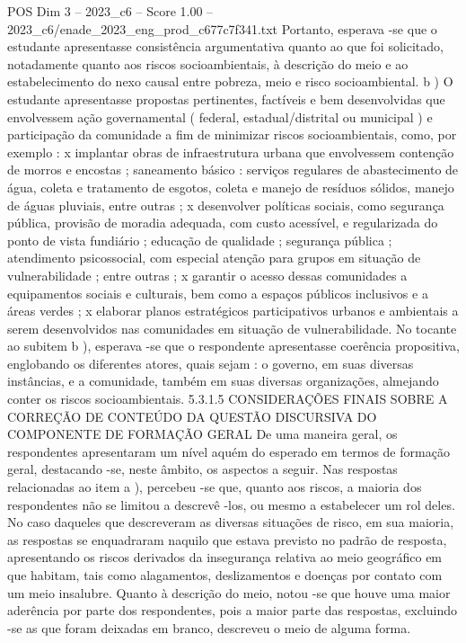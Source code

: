 \begin{textsample}{POS Dim 3 – 2023\_c6 – Score 1.00 – 2023\_c6/enade\_2023\_eng\_prod\_c677c7f341.txt}
Portanto, esperava -se que o estudante apresentasse consistência argumentativa quanto ao que foi solicitado, notadamente quanto aos riscos socioambientais, à descrição do meio e ao estabelecimento do nexo causal entre pobreza, meio e risco socioambiental. b ) O estudante apresentasse propostas pertinentes, factíveis e bem desenvolvidas que envolvessem ação governamental ( federal, estadual/distrital ou municipal ) e participação da comunidade a fim de minimizar riscos socioambientais, como, por exemplo : x implantar obras de infraestrutura urbana que envolvessem contenção de morros e encostas ; saneamento básico : serviços regulares de abastecimento de água, coleta e tratamento de esgotos, coleta e manejo de resíduos sólidos, manejo de águas pluviais, entre outras ; x desenvolver políticas sociais, como segurança pública, provisão de moradia adequada, com custo acessível, e regularizada do ponto de vista fundiário ; educação de qualidade ; segurança pública ; atendimento psicossocial, com especial atenção para grupos em situação de vulnerabilidade ; entre outras ; x garantir o acesso dessas comunidades a equipamentos sociais e culturais, bem como a espaços públicos inclusivos e a áreas verdes ; x elaborar planos estratégicos participativos urbanos e ambientais a serem desenvolvidos nas comunidades em situação de vulnerabilidade.
No tocante ao subitem b ), esperava -se que o respondente apresentasse coerência propositiva, englobando os diferentes atores, quais sejam : o governo, em suas diversas instâncias, e a comunidade, também em suas diversas organizações, almejando conter os riscos socioambientais. 5.3.1.5 CONSIDERAÇÕES FINAIS SOBRE A CORREÇÃO DE CONTEÚDO DA QUESTÃO DISCURSIVA DO COMPONENTE DE FORMAÇÃO GERAL De uma maneira geral, os respondentes apresentaram um nível aquém do esperado em termos de formação geral, destacando -se, neste âmbito, os aspectos a seguir.
Nas respostas relacionadas ao item a ), percebeu -se que, quanto aos riscos, a maioria dos respondentes não se limitou a descrevê -los, ou mesmo a estabelecer um rol deles.
No caso daqueles que descreveram as diversas situações de risco, em sua maioria, as respostas se enquadraram naquilo que estava previsto no padrão de resposta, apresentando os riscos derivados da insegurança relativa ao meio geográfico em que habitam, tais como alagamentos, deslizamentos e doenças por contato com um meio insalubre.
Quanto à descrição do meio, notou -se que houve uma maior aderência por parte dos respondentes, pois a maior parte das respostas, excluindo -se as que foram deixadas em branco, descreveu o meio de alguma forma.

\end{textsample}
